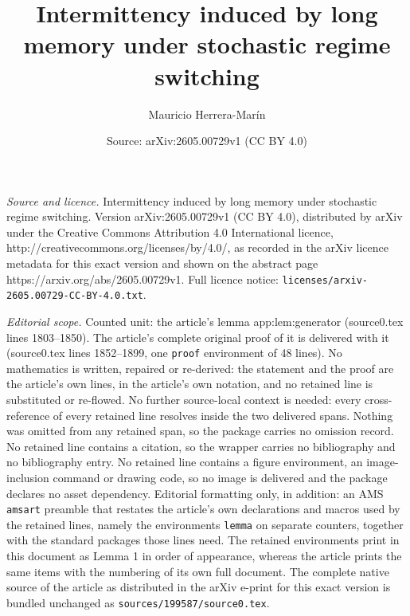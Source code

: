 \documentclass[10pt,a4paper]{amsart}
\title{Intermittency induced by long memory under stochastic regime switching}
\author{Mauricio Herrera-Mar\'in}
\date{Source: arXiv:2605.00729v1 (CC BY 4.0)}
\begin{document}
\maketitle

\noindent\emph{Source and licence.} Intermittency induced by long memory under stochastic regime switching. Version arXiv:2605.00729v1 (CC BY 4.0), distributed by arXiv under the Creative Commons Attribution 4.0 International licence, http://creativecommons.org/licenses/by/4.0/, as recorded in the arXiv licence metadata for this exact version and shown on the abstract page https://arxiv.org/abs/2605.00729v1. Full licence notice: \texttt{licenses/arxiv-2605.00729-CC-BY-4.0.txt}.\par\smallskip

\noindent\textit{Editorial scope.} Counted unit: the article's lemma app:lem:generator (source0.tex lines 1803--1850). The article's complete original proof of it is delivered with it (source0.tex lines 1852--1899, one \texttt{proof} environment of 48 lines). No mathematics is written, repaired or re-derived: the statement and the proof are the article's own lines, in the article's own notation, and no retained line is substituted or re-flowed.  No further source-local context is needed: every cross-reference of every retained line resolves inside the two delivered spans.  Nothing was omitted from any retained span, so the package carries no omission record.  No retained line contains a citation, so the wrapper carries no bibliography and no bibliography entry.  No retained line contains a figure environment, an image-inclusion command or drawing code, so no image is delivered and the package declares no asset dependency.  Editorial formatting only, in addition: an AMS \texttt{amsart} preamble that restates the article's own declarations and macros used by the retained lines, namely the environments \texttt{lemma} on separate counters, together with the standard packages those lines need.  The retained environments print in this document as Lemma 1 in order of appearance, whereas the article prints the same items with the numbering of its own full document.  The complete native source of the article as distributed in the arXiv e-print for this exact version is bundled unchanged as \texttt{sources/199587/source0.tex}.
\end{document}
